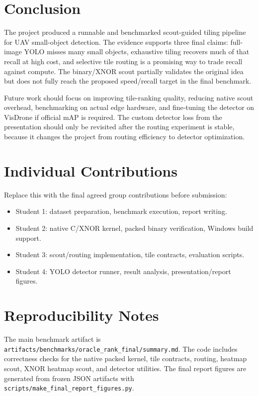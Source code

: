 \documentclass[conference]{IEEEtran}
\begin{document}
\section{Conclusion}
The project produced a runnable and benchmarked scout-guided tiling pipeline for UAV small-object detection. The evidence supports three final claims: full-image YOLO misses many small objects, exhaustive tiling recovers much of that recall at high cost, and selective tile routing is a promising way to trade recall against compute. The binary/XNOR scout partially validates the original idea but does not fully reach the proposed speed/recall target in the final benchmark.

Future work should focus on improving tile-ranking quality, reducing native scout overhead, benchmarking on actual edge hardware, and fine-tuning the detector on VisDrone if official mAP is required. The custom detector loss from the presentation should only be revisited after the routing experiment is stable, because it changes the project from routing efficiency to detector optimization.

\section*{Individual Contributions}
Replace this with the final agreed group contributions before submission:
\begin{itemize}
\item Student 1: dataset preparation, benchmark execution, report writing.
\item Student 2: native C/XNOR kernel, packed binary verification, Windows build support.
\item Student 3: scout/routing implementation, tile contracts, evaluation scripts.
\item Student 4: YOLO detector runner, result analysis, presentation/report figures.
\end{itemize}

\section*{Reproducibility Notes}
The main benchmark artifact is \texttt{artifacts/benchmarks/oracle\_rank\_final/summary.md}. The code includes correctness checks for the native packed kernel, tile contracts, routing, heatmap scout, XNOR heatmap scout, and detector utilities. The final report figures are generated from frozen JSON artifacts with \texttt{scripts/make\_final\_report\_figures.py}.



\end{document}

